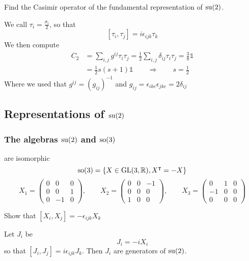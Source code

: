 \begin{example}
Find the Casimir operator of the fundamental representation of $\operatorname{su}(2)$.

We call $\tau_i = \frac{\sigma_i}{2}$, so that
\[ [\tau_i, \tau_j] = i\epsilon_{ijk}\tau_k \]
We then compute
\begin{align}
C_2 &= \sum_{i,j}g^{ij}\tau_i\tau_j = \frac{1}{2}\sum_{i,j}\delta_{ij}\tau_i\tau_j = \frac{3}{8}\mathbb{1} \\
&= \frac{1}{2}s(s+1) \mathbb{1} \qquad \Rightarrow \qquad s= \tfrac{1}{2}
\end{align}
Where we used that $g^{ij} = (g_{ij})^{-1}$ and $g_{ij} = \epsilon_{ike}\epsilon_{jke} = 2\delta_{ij}$
\end{example}

\subsection{Representations of $\operatorname{su}(2)$}
\subsubsection{The algebras $\operatorname{su}(2)$ and $\operatorname{so}(3)$} are isomorphic
\[ \operatorname{so}(3) = \{ X\in \operatorname{GL}(3,\mathbb{R}), X^\intercal = -X \} \]
\[ X_1 = \begin{pmatrix}
0 & 0 & 0 \\ 0 & 0 & 1 \\ 0 & -1 & 0
\end{pmatrix}, \qquad X_2 = \begin{pmatrix}
0 & 0 & -1 \\ 0&0&0 \\ 1&0&0
\end{pmatrix}, \qquad X_3 = \begin{pmatrix}
0&1&0 \\ -1&0&0 \\ 0&0&0
\end{pmatrix} \]

\begin{example}
Show that $[X_i,X_j] = -\epsilon_{ijk}X_k$
\end{example}

Let $J_i$ be
\[ J_i = -iX_i \]
so that $[J_i,J_j] = i\epsilon_{ijk}J_k$. Then $J_i$ are generators of $\operatorname{su}(2)$.

